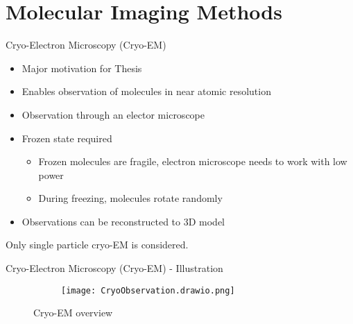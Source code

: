 
\section{Molecular Imaging Methods}	%

\begin{frame}[c]{Cryo-Electron Microscopy (Cryo-EM)}
    \begin{itemize}
        \item Major motivation for Thesis
        \item Enables observation of molecules in near atomic resolution
        \item<2-> Observation through an elector microscope
        \item<2-> Frozen state required
        \begin{itemize}
            \item<2-> Frozen molecules are fragile, electron microscope needs to work with low power
            \item<2-> During freezing, molecules rotate randomly
        \end{itemize}
        \item<2-> Observations can be reconstructed to 3D model
    \end{itemize}

    \begin{tcolorbox}[colback=red!5!white,hide=<1-2>, alert=<3>, colframe=red!75!black]
        Only single particle cryo-EM is considered.
    \end{tcolorbox}

\end{frame}

\begin{frame}[c]{Cryo-Electron Microscopy (Cryo-EM) - Illustration}
    \begin{figure}
        \captionsetup[subfigure]{justification=centering}
        \centering
        \hfill
        \begin{subfigure}[t]{0.35\textwidth}
            \vskip 0pt
            \texttt{[image: CryoObservation.drawio.png]}
        \end{subfigure}\hfill
        \caption{Cryo-EM overview}
    \end{figure}

\end{frame}

